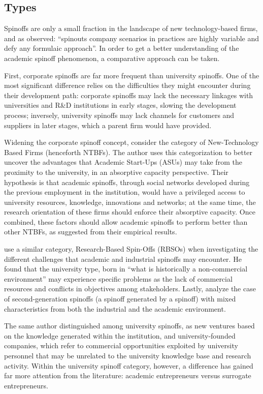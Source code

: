 \subsection{Types}

Spinoffs are only a small fraction in the landscape of new technology-based firms, and as \citet{Franklin2001} observed: \enquote{spinouts company scenarios in practices are highly variable and defy any formulaic approach}. In order to get a better understanding of the academic spinoff phenomenon, a comparative approach can be taken.

First, corporate spinoffs are far more frequent than university spinoffs. One of the most significant difference relies on the difficulties they might encounter during their development path: corporate spinoffs may lack the necessary linkages with universities and R\&D institutions in early stages, slowing the development process; inversely, university spinoffs may lack channels for customers and suppliers in later stages, which a parent firm would have provided.

Widening the corporate spinoff concept, \citet{Colombo2010} consider the category of New-Technology Based Firms (henceforth NTBFs). The author uses this categorization to better uncover the advantages that Academic Start-Ups (ASUs) may take from the proximity to the university, in an absorptive capacity perspective. Their hypothesis is that academic spinoffs, through social networks developed during the previous employment in the institution, would have a privileged access to university resources, knowledge, innovations and networks; at the same time, the research orientation of these firms should enforce their absorptive capacity. Once combined, these factors should allow academic spinoffs to perform better than other NTBFs, as suggested from their empirical results.

\citet{Mustar2006} use a similar category, Research-Based Spin-Offs (RBSOs) when investigating the different challenges that academic and industrial spinoffs may encounter. He found that the university type, born in \enquote{what is historically a non-commercial environment} may experience specific problems as the lack of commercial resources and conflicts in objectives among stakeholders. Lastly, \citet{Leitch2005} analyze the case of  second-generation spinoffs (a spinoff generated by a spinoff) with mixed characteristics from both the industrial and the academic environment.

The same author distinguished among university spinoffs, as new ventures based on the knowledge generated within the institution, and university-founded companies, which refer to commercial opportunities exploited by university personnel that may be unrelated to the university knowledge base and research activity. Within the university spinoff category, however, a difference has gained far more attention from the literature: academic entrepreneurs versus surrogate entrepreneurs.

